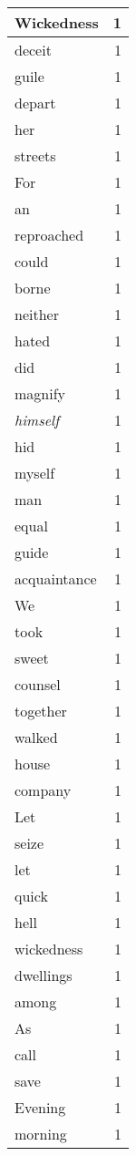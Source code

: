 \begin{center}
\begin{longtable}{l|r}
Wickedness & 1 \\ \hline
deceit & 1 \\ \hline
guile & 1 \\ \hline
depart & 1 \\ \hline
her & 1 \\ \hline
streets & 1 \\ \hline
For & 1 \\ \hline
an & 1 \\ \hline
reproached & 1 \\ \hline
could & 1 \\ \hline
borne & 1 \\ \hline
neither & 1 \\ \hline
hated & 1 \\ \hline
did & 1 \\ \hline
magnify & 1 \\ \hline
\emph{himself} & 1 \\ \hline
hid & 1 \\ \hline
myself & 1 \\ \hline
man & 1 \\ \hline
equal & 1 \\ \hline
guide & 1 \\ \hline
acquaintance & 1 \\ \hline
We & 1 \\ \hline
took & 1 \\ \hline
sweet & 1 \\ \hline
counsel & 1 \\ \hline
together & 1 \\ \hline
walked & 1 \\ \hline
house & 1 \\ \hline
company & 1 \\ \hline
Let & 1 \\ \hline
seize & 1 \\ \hline
let & 1 \\ \hline
quick & 1 \\ \hline
hell & 1 \\ \hline
wickedness & 1 \\ \hline
dwellings & 1 \\ \hline
among & 1 \\ \hline
As & 1 \\ \hline
call & 1 \\ \hline
save & 1 \\ \hline
Evening & 1 \\ \hline
morning & 1 \\ \hline

\end{longtable}
\end{center}
